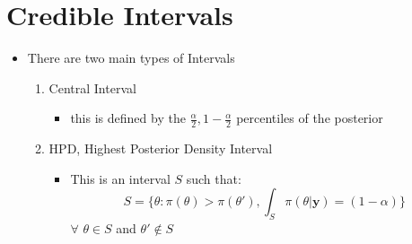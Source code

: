 \documentclass[]{article}
\begin{document}
\section{Credible Intervals}
\begin{itemize}
	\item There are two main types of Intervals
		\begin{enumerate}
			\item Central Interval
				\begin{itemize}
					\item this is defined by the $\frac{\alpha}{2},1-\frac{\alpha}{2}$ percentiles of the posterior
				\end{itemize}
			\item HPD, Highest Posterior Density Interval
			\begin{itemize}
				\item This is an interval $S$ such that: 
				\begin{equation}
				S = \{\theta:\pi(\theta) > \pi(\theta'), \int_S{\pi(\theta|\textbf{y})} = (1-\alpha)\}
				\end{equation}
				$\forall$\hspace{3pt} $\theta \in S$ and \hspace{3pt} $\theta'\notin S$
			\end{itemize}
		\end{enumerate}
\end{itemize}
\end{document}
